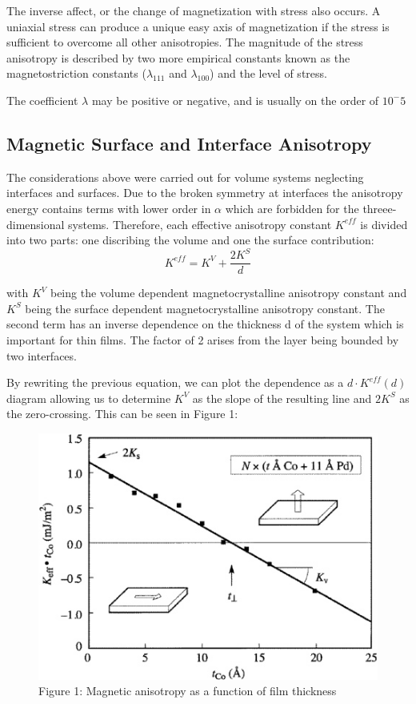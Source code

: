\documentclass[12pt]{article} %
\begin{document}
The inverse affect, or the change of magnetization with stress also occurs. A uniaxial stress can produce a unique easy axis of magnetization if the stress is sufficient to overcome all other anisotropies. The magnitude of the stress anisotropy is described by two more empirical constants known as the magnetostriction constants ($\lambda_{111}$ and $\lambda_{100}$) and the level of stress.

The coefficient $\lambda$ may be positive or negative, and is usually on the order of $10^-5$

\subsection{Magnetic Surface and Interface Anisotropy}
The considerations above were carried out for volume systems neglecting interfaces and surfaces. Due to the broken symmetry at interfaces the anisotropy energy contains terms with lower order in $\alpha$ which are forbidden for the threee-dimensional systems. Therefore, each effective anisotropy constant $K^{eff}$ is divided into two parts: one discribing the volume and one the surface contribution:
\begin{equation}
K^{eff} = K^V + \frac{2K^S}{d}
\end{equation}

with $K^V$ being the volume dependent magnetocrystalline anisotropy constant and $K^S$ being the surface dependent magnetocrystalline anisotropy constant. The second term has an inverse dependence on the thickness d of the system which is important for thin films. The factor of 2 arises from the layer being bounded by two interfaces.

By rewriting the previous equation, we can plot the dependence as a $d \cdot K^{eff}(d)$ diagram allowing us to determine $K^V$ as the slope of the resulting line and $2K^S$ as the zero-crossing. This can be seen in Figure 1:

\begin{figure}
\includegraphics[scale=1.0]{surfaceandinterface}
\caption{Figure 1: Magnetic anisotropy as a function of film thickness}
\end{figure}
\end{document}
